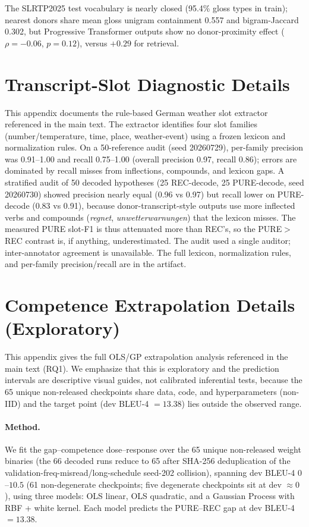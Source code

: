 \documentclass[pdflatex,sn-chicago]{sn-jnl}
\begin{document}
The SLRTP2025 test vocabulary is nearly closed (95.4\% gloss types in train); nearest donors share mean gloss unigram containment 0.557 and bigram-Jaccard 0.302, but Progressive Transformer outputs show no donor-proximity effect ($\rho{=}{-}0.06$, $p{=}0.12$), versus $+0.29$ for retrieval.

\section{Transcript-Slot Diagnostic Details}
\label{sec:appendix_slot}
This appendix documents the rule-based German weather slot extractor referenced in the main text. The extractor identifies four slot families (number/temperature, time, place, weather-event) using a frozen lexicon and normalization rules. On a 50-reference audit (seed 20260729), per-family precision was 0.91--1.00 and recall 0.75--1.00 (overall precision 0.97, recall 0.86); errors are dominated by recall misses from inflections, compounds, and lexicon gaps. A stratified audit of 50 decoded hypotheses (25 REC-decode, 25 PURE-decode, seed 20260730) showed precision nearly equal (0.96 vs 0.97) but recall lower on PURE-decode (0.83 vs 0.91), because donor-transcript-style outputs use more inflected verbs and compounds (\emph{regnet}, \emph{unwetterwarnungen}) that the lexicon misses. The measured PURE slot-F1 is thus attenuated more than REC's, so the PURE${>}$REC contrast is, if anything, underestimated. The audit used a single auditor; inter-annotator agreement is unavailable. The full lexicon, normalization rules, and per-family precision/recall are in the artifact.

\section{Competence Extrapolation Details (Exploratory)}
\label{sec:appendix_extrapolation}
This appendix gives the full OLS/GP extrapolation analysis referenced in the main text (RQ1). We emphasize that this is exploratory and the prediction intervals are descriptive visual guides, not calibrated inferential tests, because the 65 unique non-released checkpoints share data, code, and hyperparameters (non-IID) and the target point (dev BLEU-4 $=13.38$) lies outside the observed range.

\paragraph{Method.}
We fit the gap--competence dose--response over the 65 unique non-released weight binaries (the 66 decoded runs reduce to 65 after SHA-256 deduplication of the validation-freq-misread/long-schedule seed-202 collision), spanning dev BLEU-4 $0$--$10.5$ (61 non-degenerate checkpoints; five degenerate checkpoints sit at dev $\approx 0$), using three models: OLS linear, OLS quadratic, and a Gaussian Process with RBF + white kernel. Each model predicts the PURE--REC gap at dev BLEU-4 $=13.38$.
\end{document}
